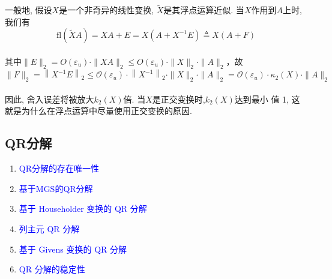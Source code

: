 \documentclass[12pt,a4paper]{article}
\begin{document}
\noindent 一般地, 假设$X$是一个非奇异的线性变换, $\tilde{X}$是其浮点运算近似. 当$X$作用到$A$上时, 我们有$$
\mathrm{fl}(\tilde{X} A)=X A+E=X\left(A+X^{-1} E\right) \triangleq X(A+F)
$$\\
其中$\|E\|_{2}=O\left(\varepsilon_{u}\right) \cdot\|X A\|_{2} \leq O\left(\varepsilon_{u}\right) \cdot\|X\|_{2} \cdot\|A\|_{2}$，故$$
\|F\|_{2}=\left\|X^{-1} E\right\|_{2} \leq \mathcal{O}\left(\varepsilon_{u}\right) \cdot\left\|X^{-1}\right\|_{2} \cdot\|X\|_{2} \cdot\|A\|_{2}=\mathcal{O}\left(\varepsilon_{u}\right) \cdot \kappa_{2}(X) \cdot\|A\|_{2}
$$\\
因此, 舍入误差将被放大$k_2(X)$倍. 当$X$是正交变换时,$k_2(X)$达到最小
值 1, 这就是为什么在浮点运算中尽量使用正交变换的原因.\\

\subsection{QR分解}
\begin{enumerate}[3.1]
	\item \textcolor{blue}{QR分解的存在唯一性}
	\item \textcolor{blue}{基于MGS的QR分解}
	\item \textcolor{blue}{基于 Householder 变换的 QR 分解}
	\item \textcolor{blue}{列主元 QR 分解}
	\item \textcolor{blue}{基于 Givens 变换的 QR 分解}
	\item \textcolor{blue}{QR 分解的稳定性}
\end{enumerate}
\end{document}
